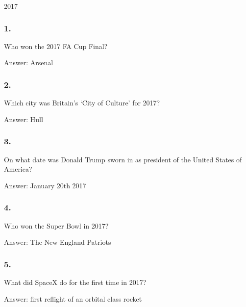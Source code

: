 \documentclass{beamer}
\begin{document}
    \begin{frame}
        \begin{center}
            \Huge 2017
        \end{center}
    \end{frame}

    \begin{frame}
        \frametitle{1.}
        Who won the 2017 FA Cup Final?\\ 

        \begin{center}
            Answer: Arsenal
        \end{center}
    \end{frame}

    \begin{frame}
        \frametitle{2.}
        Which city was Britain's `City of Culture' for 2017?\\

        \begin{center}
            Answer: Hull
        \end{center}
    \end{frame}

    \begin{frame}
        \frametitle{3.}
        On what date was Donald Trump sworn in as president of the United
        States of America?\\

        \begin{center}
            Answer: January 20th 2017
        \end{center}
    \end{frame}

    \begin{frame}
        \frametitle{4.}
        Who won the Super Bowl in 2017?\\

        \begin{center}
            Answer: The New England Patriots
        \end{center}
    \end{frame}

    \begin{frame}
        \frametitle{5.}
        What did SpaceX do for the first time in 2017?\\

        \begin{center}
            Answer: first reflight of an orbital class rocket
        \end{center}
    \end{frame}
\end{document}
